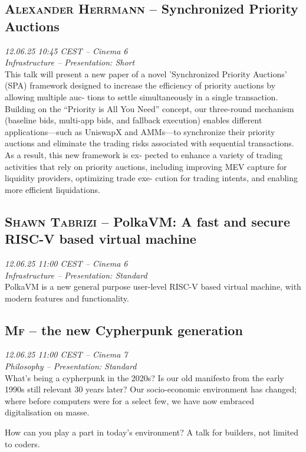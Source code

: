 \clearpage
\subsection {\textsc{Alexander Herrmann}  -- Synchronized Priority Auctions} \noindent \textit {12.06.25 10:45 CEST -- Cinema 6\\ Infrastructure -- Presentation: Short}\\[1em] This talk will present a new paper of a novel ’Synchronized Priority Auctions’ (SPA) framework
designed to increase the efficiency of priority auctions by allowing multiple auc-
tions to settle simultaneously in a single transaction. Building on the “Priority
is All You Need” concept, our three-round mechanism (baseline bids, multi-app
bids, and fallback execution) enables different applications—such as UniswapX
and AMMs—to synchronize their priority auctions and eliminate the trading risks
associated with sequential transactions. As a result, this new framework is ex-
pected to enhance a variety of trading activities that rely on priority auctions,
including improving MEV capture for liquidity providers, optimizing trade exe-
cution for trading intents, and enabling more efficient liquidations.

\clearpage
\subsection {\textsc{Shawn Tabrizi}  -- PolkaVM: A fast and secure RISC-V based virtual machine} \noindent \textit {12.06.25 11:00 CEST -- Cinema 6\\ Infrastructure -- Presentation: Standard}\\[1em] PolkaVM is a new general purpose user-level RISC-V based virtual machine, with modern features and functionality.

\clearpage
\subsection {\textsc{Mf}  -- the new Cypherpunk generation} \noindent \textit {12.06.25 11:00 CEST -- Cinema 7\\ Philosophy -- Presentation: Standard}\\[1em] What's being a cypherpunk in the 2020s? Is our old manifesto from the early 1990s still relevant 30 years later? Our socio-economic environment has changed; where before computers were for a select few, we have now embraced digitalisation on masse.

How can you play a part in today's environment? A talk for builders, not limited to coders.

